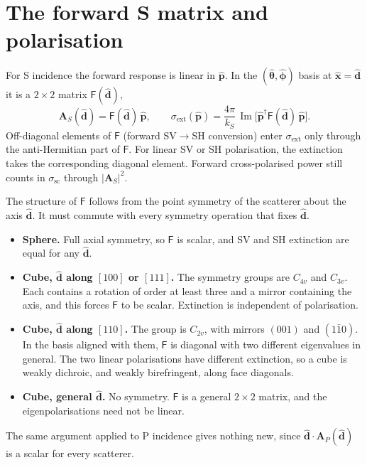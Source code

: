 \documentclass[11pt,a4paper]{article}
\newcommand{\bA}{\mathbf{A}}
\newcommand{\bd}{\hat{\mathbf{d}}}
\newcommand{\bp}{\hat{\mathbf{p}}}
\newcommand{\xh}{\hat{\mathbf{x}}}
\newcommand{\thh}{\hat{\boldsymbol{\theta}}}
\newcommand{\phh}{\hat{\boldsymbol{\phi}}}
\newcommand{\herm}{^{\dagger}}
\newcommand{\sext}{\sigma_{\mathrm{ext}}}
\newcommand{\ssc}{\sigma_{\mathrm{sc}}}
\newcommand{\ks}{k_{S}}
\DeclareMathOperator{\Imag}{Im}
\begin{document}
\section{The forward S matrix and polarisation}
\label{sec:forward-matrix}

For S incidence the forward response is linear in $\bp$. In the
$(\thh,\phh)$ basis at $\xh = \bd$ it is a $2\times2$ matrix
$\mathsf{F}(\bd)$,
\begin{equation}
  \bA_S(\bd) = \mathsf{F}(\bd)\,\bp, \qquad
  \sext(\bp) = \frac{4\pi}{\ks}\,\Imag\bigl[\bp\herm\mathsf{F}(\bd)\,\bp\bigr].
  \label{eq:fmatrix}
\end{equation}
Off-diagonal elements of $\mathsf{F}$ (forward SV$\to$SH conversion)
enter $\sext$ only through the anti-Hermitian part of $\mathsf{F}$. For
linear SV or SH polarisation, the extinction takes the corresponding
diagonal element. Forward cross-polarised power still counts in
$\ssc$ through $|\bA_S|^2$.

The structure of $\mathsf{F}$ follows from the point symmetry of the
scatterer about the axis $\bd$. It must commute with every symmetry
operation that fixes $\bd$.
\begin{itemize}
\item \textbf{Sphere.} Full axial symmetry, so $\mathsf{F}$ is scalar,
  and SV and SH extinction are equal for any $\bd$.
\item \textbf{Cube, $\bd$ along $[100]$ or $[111]$.} The symmetry groups
  are $C_{4v}$ and $C_{3v}$. Each contains a rotation of order at least
  three and a mirror containing the axis, and this forces $\mathsf{F}$ to
  be scalar. Extinction is independent of polarisation.
\item \textbf{Cube, $\bd$ along $[110]$.} The group is $C_{2v}$, with
  mirrors $(001)$ and $(1\bar{1}0)$. In the basis aligned with them,
  $\mathsf{F}$ is diagonal with two different eigenvalues in general.
  The two linear polarisations have different extinction, so a cube is
  weakly dichroic, and weakly birefringent, along face diagonals.
\item \textbf{Cube, general $\bd$.} No symmetry. $\mathsf{F}$ is a
  general $2\times2$ matrix, and the eigenpolarisations need not be
  linear.
\end{itemize}
The same argument applied to P incidence gives nothing new, since
$\bd\cdot\bA_P(\bd)$ is a scalar for every scatterer.
\end{document}

